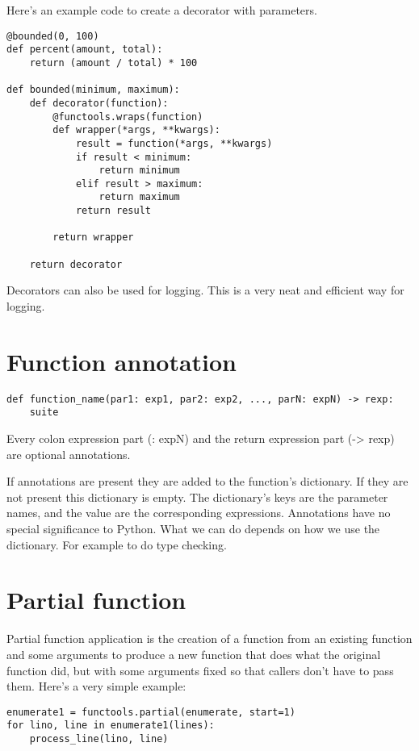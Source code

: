 Here's an example code to create a decorator with parameters.
\begin{lstlisting}
@bounded(0, 100)
def percent(amount, total):
    return (amount / total) * 100

def bounded(minimum, maximum):
    def decorator(function):
        @functools.wraps(function)
        def wrapper(*args, **kwargs):
            result = function(*args, **kwargs)
            if result < minimum:
                return minimum
            elif result > maximum:
                return maximum
            return result

        return wrapper

    return decorator
\end{lstlisting}


Decorators can also be used for logging.
This is a very neat and efficient way for logging.

\section{Function annotation}
\label{sec:function-annotation}

\begin{lstlisting}
def function_name(par1: exp1, par2: exp2, ..., parN: expN) -> rexp:
    suite
\end{lstlisting}

Every colon expression part (: expN) and the return expression part (-> rexp) are optional annotations.

If annotations are present they are added to the function's  dictionary.
If they are not present this dictionary is empty.
The dictionary's keys are the parameter names, and the value are the corresponding expressions.
Annotations have no special significance to Python.
What we can do depends on how we use the  dictionary.
For example to do type checking.

\section{Partial function}
\label{sec:partial-function}

Partial function application is the creation of a function from an existing function and some arguments to produce a new function that does what the original function did, but with some arguments fixed so that callers don’t have to pass them.
Here’s a very simple example:
\begin{lstlisting}
enumerate1 = functools.partial(enumerate, start=1)
for lino, line in enumerate1(lines):
    process_line(lino, line)
\end{lstlisting}



